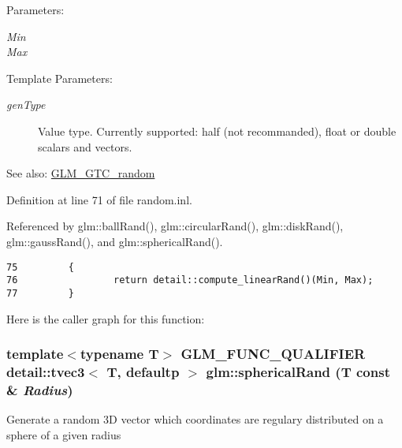 \begin{Desc}
\item[Parameters:]
\begin{description}
\item[{\em Min}]\item[{\em Max}]\end{description}
\end{Desc}
\begin{Desc}
\item[Template Parameters:]
\begin{description}
\item[{\em genType}]Value type. Currently supported: half (not recommanded), float or double scalars and vectors. \end{description}
\end{Desc}
\begin{Desc}
\item[See also:]\hyperlink{group__gtc__random}{GLM\_\-GTC\_\-random} \end{Desc}


Definition at line 71 of file random.inl.

Referenced by glm::ballRand(), glm::circularRand(), glm::diskRand(), glm::gaussRand(), and glm::sphericalRand().

\begin{Code}\begin{verbatim}75         {
76                 return detail::compute_linearRand()(Min, Max);
77         }
\end{verbatim}
\end{Code}




Here is the caller graph for this function:\hypertarget{group__gtc__random_g02f5a6b98ae4e494eef340bcdd38ed35}{
\subsubsection[sphericalRand]{\setlength{\rightskip}{0pt plus 5cm}template$<$typename T$>$ GLM\_\-FUNC\_\-QUALIFIER detail::tvec3$<$ T, defaultp $>$ glm::sphericalRand (T const \& {\em Radius})}}
\label{group__gtc__random_g02f5a6b98ae4e494eef340bcdd38ed35}


Generate a random 3D vector which coordinates are regulary distributed on a sphere of a given radius


